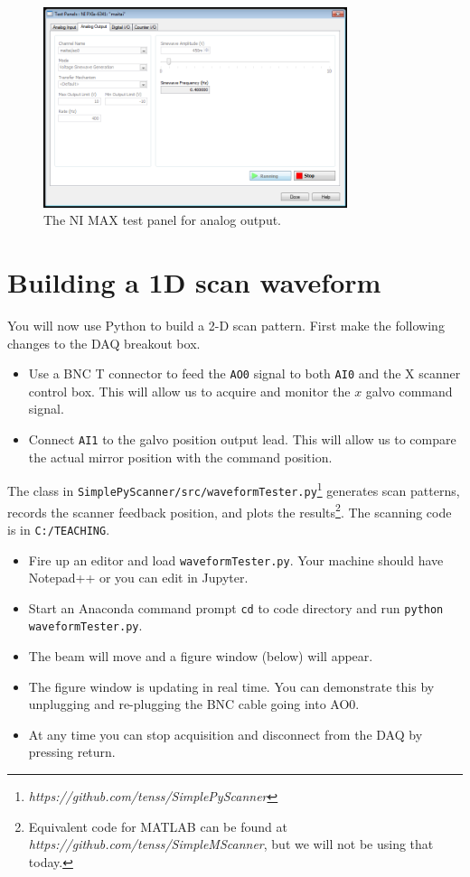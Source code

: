 \documentclass[a4paper]{report}
\begin{document}
\begin{figure}[h]
\centering
\includegraphics[width=3.5in]{MAX_for_1D.png}
\caption{The NI MAX test panel for analog output.}
\label{DAQMX}
\end{figure}



\clearpage

\section{Building a 1D scan waveform}

You will now use Python to build a 2-D scan pattern. 
First make the following changes to the DAQ breakout box. 

\begin{itemize}
    \setlength\itemsep{0.15em}
    \item Use a BNC T connector to feed the \texttt{AO0} signal to both \texttt{AI0} and the X scanner control box. This will allow us to acquire and monitor the $x$ galvo command signal.
    \item Connect \texttt{AI1} to the galvo position output lead. This will allow us to compare the actual mirror position with the command position.
\end{itemize}

\noindent
The class in \texttt{SimplePyScanner/src/waveformTester.py}\footnote{\textit{https://github.com/tenss/SimplePyScanner}} generates scan patterns, records the scanner feedback position, and plots the results\footnote{Equivalent code for MATLAB can be found at \textit{https://github.com/tenss/SimpleMScanner}, but we will not be using that today.}.  
The scanning code is in \texttt{C:/TEACHING}. 


\begin{itemize}
\setlength\itemsep{0.15em}
\item Fire up an editor and load \texttt{waveformTester.py}. Your machine should have Notepad++ or you can edit in Jupyter.
\item Start an Anaconda command prompt \texttt{cd} to code directory and run \texttt{python waveformTester.py}. 
\item The beam will move and a figure window (below) will appear.
\item The figure window is updating in real time. You can demonstrate this by unplugging and re-plugging the BNC cable going into AO0. 
\item At any time you can stop acquisition and disconnect from the DAQ by pressing return. 
\end{itemize}
\end{document}
